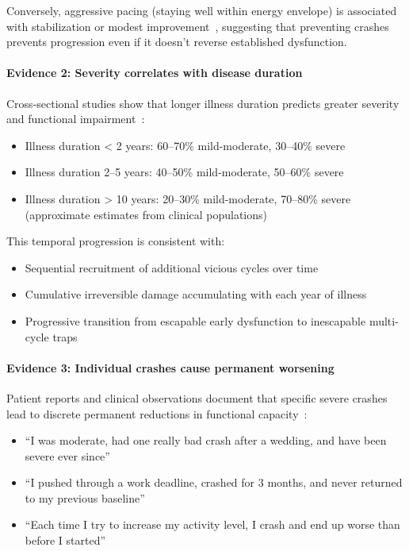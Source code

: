 Conversely, aggressive pacing (staying well within energy envelope) is associated with stabilization or modest improvement~\cite{jason2012energy}, suggesting that preventing crashes prevents progression even if it doesn't reverse established dysfunction.

\paragraph{Evidence 2: Severity correlates with disease duration}

Cross-sectional studies show that longer illness duration predicts greater severity and functional impairment~\cite{Lacourt2022prognosis}:
\begin{itemize}
    \item Illness duration < 2 years: 60--70\% mild-moderate, 30--40\% severe
    \item Illness duration 2--5 years: 40--50\% mild-moderate, 50--60\% severe
    \item Illness duration > 10 years: 20--30\% mild-moderate, 70--80\% severe (approximate estimates from clinical populations)
\end{itemize}

This temporal progression is consistent with:
\begin{itemize}
    \item Sequential recruitment of additional vicious cycles over time
    \item Cumulative irreversible damage accumulating with each year of illness
    \item Progressive transition from escapable early dysfunction to inescapable multi-cycle traps
\end{itemize}

\paragraph{Evidence 3: Individual crashes cause permanent worsening}

Patient reports and clinical observations document that specific severe crashes lead to discrete permanent reductions in functional capacity~\cite{Chu2019}:
\begin{itemize}
    \item ``I was moderate, had one really bad crash after a wedding, and have been severe ever since''
    \item ``I pushed through a work deadline, crashed for 3 months, and never returned to my previous baseline''
    \item ``Each time I try to increase my activity level, I crash and end up worse than before I started''
\end{itemize}

